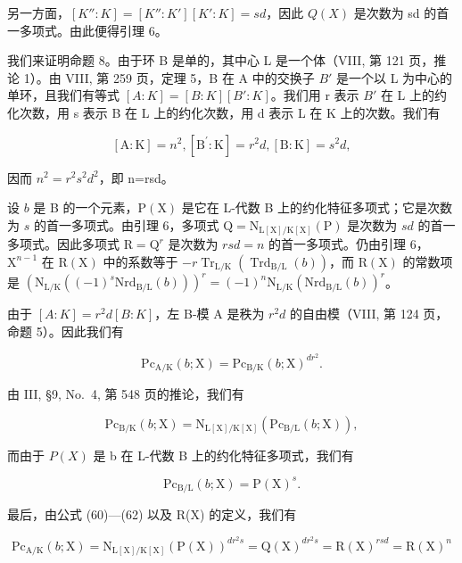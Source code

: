 另一方面，\([K'' : K] = [K'' : K'][K' : K] = sd\)，因此 \(Q(X)\) 是次数为 sd 的首一多项式。由此便得引理 6。

我们来证明命题 8。由于环 B 是单的，其中心 L 是一个体（VIII, 第 121 页，推论 1）。由 VIII, 第 259 页，定理 5，B 在 A 中的交换子 \(B'\) 是一个以 L 为中心的单环，且我们有等式 \([A:K]=[B:K][B':K]\)。我们用 r 表示 \(B'\) 在 L 上的约化次数，用 s 表示 B 在 L 上的约化次数，用 d 表示 L 在 K 上的次数。我们有

\[
[ \mathrm{A}: \mathrm{K} ] = n ^ {2}, [ \mathrm{B} ^ {\prime}: \mathrm{K} ] = r ^ {2} d, [ \mathrm{B}: \mathrm{K} ] = s ^ {2} d,
\]

因而 \(n^{2}=r^{2}s^{2}d^{2}\)，即 n=rsd。

设 \(b\) 是 B 的一个元素，\(\mathrm{P}(\mathrm{X})\) 是它在 L-代数 B 上的约化特征多项式；它是次数为 \(s\) 的首一多项式。由引理 6，多项式 \(\mathrm{Q} = \mathrm{N}_{\mathrm{L}[\mathrm{X}] / \mathrm{K}[\mathrm{X}]}(\mathrm{P})\) 是次数为 \(sd\) 的首一多项式。因此多项式 \(\mathrm{R} = \mathrm{Q}^r\) 是次数为 \(rsd = n\) 的首一多项式。仍由引理 6，\(\mathrm{X}^{n - 1}\) 在 \(\mathrm{R}(\mathrm{X})\) 中的系数等于 \(-r\operatorname{Tr}_{\mathrm{L} / \mathrm{K}}(\operatorname{Trd}_{\mathrm{B} / \mathrm{L}}(b))\)，而 \(\mathrm{R}(\mathrm{X})\) 的常数项是 \((\mathrm{N}_{\mathrm{L} / \mathrm{K}}((-1)^s\mathrm{Nrd}_{\mathrm{B} / \mathrm{L}}(b)))^r = (-1)^n\mathrm{N}_{\mathrm{L} / \mathrm{K}}(\mathrm{Nrd}_{\mathrm{B} / \mathrm{L}}(b))^r\)。

由于 \([A:K]=r^{2}d[B:K]\)，左 B-模 A 是秩为 \(r^{2}d\) 的自由模（VIII, 第 124 页，命题 5）。因此我们有

\[
\mathrm{Pc} _ {\mathrm{A/K}} (b; \mathrm{X}) = \mathrm{Pc} _ {\mathrm{B/K}} (b; \mathrm{X}) ^ {d r ^ {2}}.\tag{60}
\]

由 III, §9, No.~4, 第 548 页的推论，我们有

\[
\mathrm{Pc} _ {\mathrm{B/K}} (b; \mathrm{X}) = \mathrm{N} _ {\mathrm{L[X] / K[X]}} (\mathrm{Pc} _ {\mathrm{B/L}} (b; \mathrm{X})),\tag{61}
\]

而由于 \(P(X)\) 是 b 在 L-代数 B 上的约化特征多项式，我们有

\[
\mathrm{Pc} _ {\mathrm{B/L}} (b; \mathrm{X}) = \mathrm{P(X)} ^ {s}.\tag{62}
\]

最后，由公式 (60)---(62) 以及 R(X) 的定义，我们有

\[
\mathrm{Pc} _ {\mathrm{A/K}} (b; \mathrm{X}) = \mathrm{N} _ {\mathrm{L[X]/K[X]}} (\mathrm{P(X)}) ^ {d r ^ {2} s} = \mathrm{Q(X)} ^ {d r ^ {2} s} = \mathrm{R(X)} ^ {r s d} = \mathrm{R(X)} ^ {n}\tag{63}
\]

